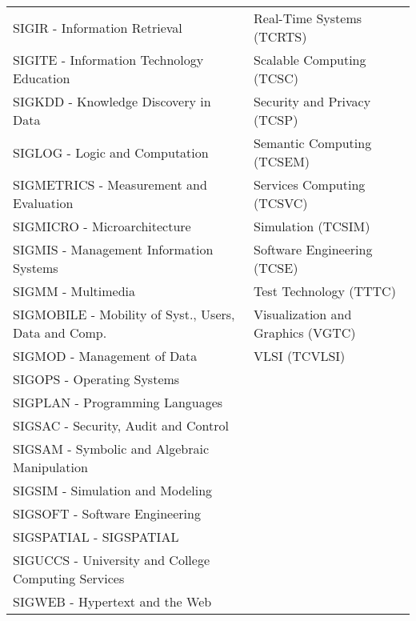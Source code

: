 \begin{table}[htbp]
\begin{tabular}{ll}
SIGIR - Information Retrieval								&	Real-Time Systems (TCRTS)								\\
SIGITE - Information Technology Education					&	Scalable Computing (TCSC)								\\
SIGKDD - Knowledge Discovery in Data						&	Security and Privacy (TCSP)								\\
SIGLOG - Logic and Computation								&	Semantic Computing (TCSEM)								\\
SIGMETRICS - Measurement and Evaluation						&	Services Computing (TCSVC)								\\
SIGMICRO - Microarchitecture								&	Simulation (TCSIM)										\\	
SIGMIS - Management Information Systems						&	Software Engineering (TCSE)								\\
SIGMM - Multimedia											&	Test Technology (TTTC)									\\
SIGMOBILE - Mobility of Syst., Users, Data and Comp.		&	Visualization and Graphics (VGTC)						\\
SIGMOD - Management of Data									&	VLSI (TCVLSI)											\\
SIGOPS - Operating Systems									&															\\
SIGPLAN - Programming Languages								&															\\
SIGSAC - Security, Audit and Control						&															\\
SIGSAM - Symbolic and Algebraic Manipulation				&															\\
SIGSIM - Simulation and Modeling							&															\\
SIGSOFT - Software Engineering								&															\\
SIGSPATIAL - SIGSPATIAL										&															\\
SIGUCCS - University and College Computing Services			&															\\
SIGWEB - Hypertext and the Web								&															\\
\bottomrule
\end{tabular}
\end{table}

